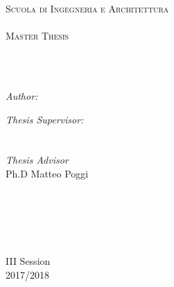 \documentclass[
11pt, %
english, %
singlespacing, %
headsepline, %
]{MastersDoctoralThesis} %
\author{Ali Alessio Salman} %
\begin{document}
\frontmatter %

\pagestyle{plain} %


\begin{titlepage}
\begin{center}

\vspace*{.06\textheight}
{\scshape\LARGE \univname\par}\vspace{1.5cm} %
\textsc{Scuola di Ingegneria e Architettura \\ \textit{\subjectname} \\[2\baselineskip] \Large Master Thesis }\\[0.5cm] %

\HRule \\[0.4cm] %
{\huge \bfseries \ttitle\par}\vspace{0.4cm} %
\HRule \\[1.5cm] %

\begin{minipage}[t]{0.4\textwidth}
\begin{flushleft} \large
\emph{Author:}\\
{\authorname} %
\end{flushleft}
\end{minipage}
\begin{minipage}[t]{0.4\textwidth}
\begin{flushright} \large
\emph{Thesis Supervisor:} \\
{\supname} \\%
\emph{\\Thesis Advisor}\\
Ph.D Matteo Poggi

\end{flushright}
\end{minipage}\\[3cm]

\vfill
\textit{}\\[0.4cm]
\groupname\\\deptname\\[2cm] %
 
\vfill

\vfill

{\large III Session\\2017/2018}\\[4cm] %
 
\vfill
\end{center}
\end{titlepage}
\end{document}

